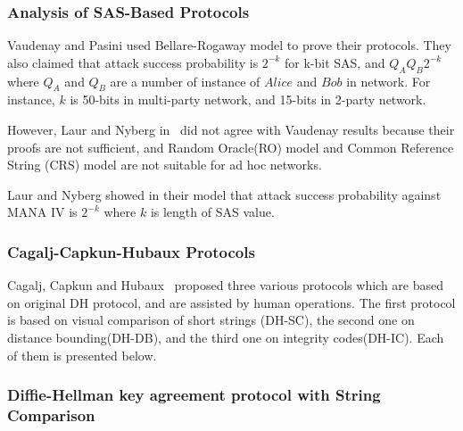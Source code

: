 \subsubsection*{Analysis of SAS-Based Protocols}

Vaudenay and Pasini used Bellare-Rogaway model to prove their protocols. They also claimed that attack success probability is $2^{-k}$ for k-bit SAS, and $Q_A Q_B 2^{-k}$ where $Q_A$ and $Q_B$ are a number of instance of $Alice$ and $Bob$ in network. For instance, $k$ is 50-bits in multi-party network, and 15-bits in 2-party network.

However, Laur and Nyberg in~\cite{Laur:2006kl} did not agree with Vaudenay results because their proofs are not sufficient, and Random Oracle(RO) model and Common Reference String (CRS) model are not suitable for ad hoc networks.

Laur and Nyberg showed in their model that attack success probability against MANA IV is $2^ {-k}$ where $k$ is length of SAS value.

\subsubsection{Cagalj-Capkun-Hubaux Protocols}

Cagalj, Capkun and Hubaux~\cite{1580514} proposed three various protocols which are based on original DH protocol, and are assisted by human operations. The first protocol is based on visual comparison of short strings (DH-SC), the second one on distance bounding(DH-DB), and the third one on integrity codes(DH-IC). Each of them is presented below. 
 
\subsubsection*{Diffie-Hellman key agreement protocol with String Comparison}

